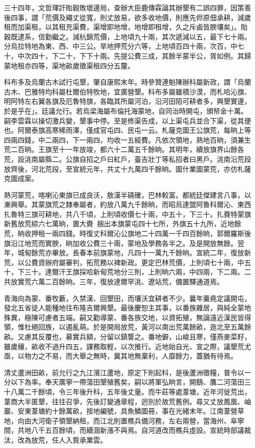 \begin{pinyinscope}
三十四年，文哲琿訐貽穀敗壞邊局，查辦大臣鹿傳霖論其辦墾有二誤四罪，因策善後四事，謂「荒價及繩丈從寬，則丈放易，欲多收地價，則應先侭原佃承耕，減歲租而加渠租，以其租充渠費，渠增即地增，地增即租增，久之斥鹵皆腴壤矣」。貽穀既逮系，信勤繼之。減杭錦荒價，上地頃九十兩，其次遞減以五，最下七十兩。分烏拉特地為東、西、中三公。旱地押荒分六等，上地頃百四十兩，次百，中七十，中次四十，下二十，下下十兩。先提公費三成，其餘半蒙半公，胥如例。其歸蒙地租亦四等，渠地畝歲徵渠租四分五釐。

科布多及烏蘭古木試行屯墾，肇自康熙末年。時參贊連魁陳辦科屬新政，謂「烏蘭古木、巴雅特均科屬杜爾伯特牧地，宜廣營墾。科布多屬雖積沙漠，而札哈沁旗、明阿特左右翼各旗及厄魯特旗，各臨其所屬河泊，沿河田陌可耕者多，興墾實邊，於是乎在」。廷議允行。若烏梁海屬布倫托海蒙地，自同治時開屯，頒帑金十萬。嗣李雲霖以操切激兵變，墾事中停。至是修渠告成，以上渠屯兵並合下渠，從其便也。阿爾泰旗高寒稀雨澤，僅成官屯四、民屯一云。札薩克圖王公旗荒，每晌上等四兩四錢，中二兩四，下一兩四，均收一五經費。凡依次領地，熟地百晌，須兼生荒二百晌。王旗至十一年放竣，都六十二萬五千餘晌。其明年，續放旗界山餘各荒，設洮南屬縣二。公旗自招之戶曰紅戶，臺吉壯丁等私招者曰黑戶。洮南沿荒段放齊後，河北荒段，至宣統元年，共丈十九萬四千餘晌。圖什業圖蒙荒，亦仿札薩克圖成案。

熱河蒙荒，喀喇沁東旗已成良沃，敖漢半磽確，巴林較富。都統廷傑建言八事，以漸興舉。其蒙旗荒之隸奉屬者，約放八萬九千餘晌，而昭烏達盟阿魯科爾沁、東西扎魯特三旗可耕地，共八千頃，上則頃收價七十兩，中五十，下三十。扎賚特蒙旗新舊放荒綜六七萬晌，置大賚，捆出本旗蒙屯四十七所，外旗五十九所，近地餘荒，晌收押租一兩四錢。時復丈科爾沁公旗地二十四萬一千四百餘晌，郭爾羅斯後旗沿江地荒而實腴，晌加收公費三十兩，蒙地及學務各半之。及是開放無餘。翌年，城甸餘荒亦畢放。長春本前旗蒙地，凡四十一萬九千餘晌。宣統二年，復放新荒，以公費資辦府屬審判，拓荒務以裨新政。更定巴林荒價，上則頃七十兩，中五十，下三十。達爾汗王旗採哈新甸荒地分三則，上則晌六兩，中四兩，下二兩。二共放實荒六萬二百餘晌。三年，復放達爾罕洮、遼站荒，備置驛通道焉。

青海向為蒙、番牧藪，久禁漢、回墾田，而壤沃宜耕者不少。曩年羹堯定議開屯，發北五省徒人能種地往布隆吉爾興墾。最後慶恕主其事，以番族雜居，與純全蒙地殊異，極陳可慮者五端。嗣又勸導蒙、番各族交地，以資拓殖，無論遠近漢民皆得領，惟杜絕回族，以遏亂萌。於是開局放荒，黃河以南出荒萬餘畝，迤北至五萬餘畝。又慮其反覆也，募實兵額，分留以鎮讋之。番地僻，山峻且寒，僅燕麥菜籽，雖歲穰，畝收不過升四五，課務取輕，以次推行。近地始自光、宣之際，議墾荒尤亟，以物力之不易，而大舉之無時，冀其地無棄利，人靡餘力，蓋猶有待焉。

清丈蘆洲田畝，前允行之九江濱江蘆地，原定下則起科，是後蘆洲徵糧，普令以一分以下為率。奉天廣寧一帶蕩田墾殖舊矣，嗣以將軍弘晌言，開鷂、鷹二河蕩田三十八萬二千餘頃，令三年後升科，五年後丈量。而牛莊等處葦塘，近年河徙荒出，葦商大半匿墾，往往召爭，先後訂變通章程，迥別於故荒舊例。尋又丈放鳳凰、岫巖、安東葦塘約十餘萬畝，按地編號，具魚鱗圖冊，事在光緒末年。江南葦營草地，向由大河衛子領墾納租，而江北則置樵兵備河務，左右兩營，當海州、阜寧間，共地八千五百餘頃，而續涸新漲不與焉。自河道改而樵兵虛設。宣統時部議裁汰，改為放荒，任人入貲承業雲。


\end{pinyinscope}
